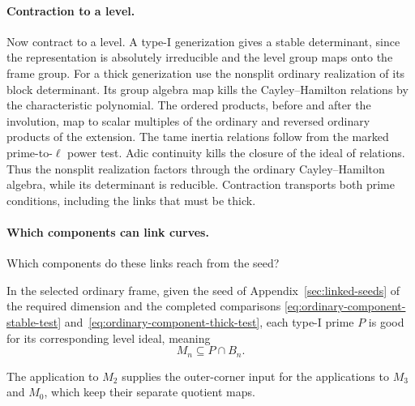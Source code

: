 \paragraph{Contraction to a level.} Now contract to a level. A type-I generization gives
a stable determinant, since the representation
is absolutely irreducible and the level group maps onto the
frame group. For a thick generization use the nonsplit
ordinary realization of its block determinant. Its group algebra
map kills the Cayley--Hamilton relations by the characteristic
polynomial. The ordered products, before and after the involution,
map to scalar multiples of the ordinary and reversed ordinary
products of the extension. The tame inertia relations follow
from the marked prime-to-\(\ell\) power test. Adic continuity
kills the closure of the ideal of relations. Thus the nonsplit
realization factors through the ordinary Cayley--Hamilton algebra,
while its determinant is reducible. Contraction transports
both prime conditions, including the links that must be thick.

\begin{construction}
\caption{Propagation uses the rank-two comparison first. Its outer-corner input is applied to two different rank-three support problems.}\label{fig:ordinary-three-levels}
\end{construction}

\paragraph{Which components can link curves.}
Which components do these links reach from the seed?

\begin{proposition}
\label{prop:ordinary-component-propagation}
In the selected ordinary frame, given the seed of Appendix~\ref{sec:linked-seeds} of the required dimension
and the completed comparisons
\eqref{eq:ordinary-component-stable-test} and~\eqref{eq:ordinary-component-thick-test},
each type-I prime \(P\) is good for its corresponding level ideal, meaning 
\[
 M_n\subseteq P\cap B_n.
\]

The application to \(M_2\) supplies the outer-corner input for the
applications to \(M_3\) and \(M_0\), which keep their separate
quotient maps.
\end{proposition}

